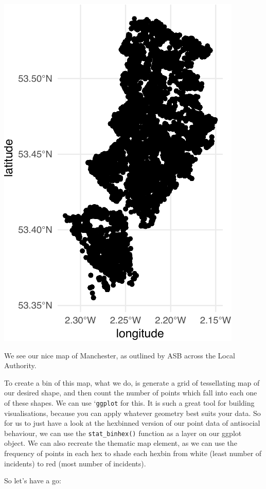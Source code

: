 \documentclass[
]{book}
\begin{document}
\includegraphics{crime_mapping_files/figure-latex/unnamed-chunk-124-1.pdf}

We see our nice map of Manchester, as outlined by ASB across the Local Authority.

To create a bin of this map, what we do, is generate a grid of tessellating map of our desired shape, and then count the number of points which fall into each one of these shapes. We can use `\texttt{ggplot} for this. It is such a great tool for building visualisations, because you can apply whatever geometry best suits your data. So for us to just have a look at the hexbinned version of our point data of antisocial behaviour, we can use the \texttt{stat\_binhex()} function as a layer on our ggplot object. We can also recreate the thematic map element, as we can use the frequency of points in each hex to shade each hexbin from white (least number of incidents) to red (most number of incidents).

So let's have a go:
\end{document}
